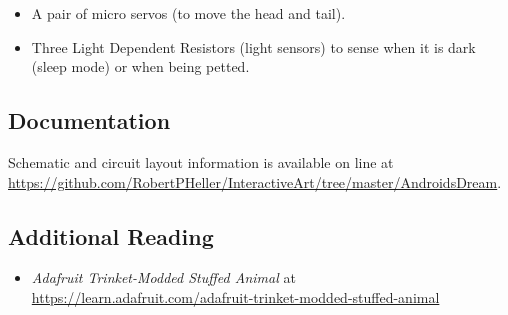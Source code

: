 \begin{itemize}
\item A pair of micro servos (to move the head and tail).
\item Three Light Dependent Resistors (light sensors) to sense when it is dark
(sleep mode) or when being petted.
\end{itemize}

\subsection*{Documentation}

Schematic and circuit layout information is available on line at 
\url{https://github.com/RobertPHeller/InteractiveArt/tree/master/AndroidsDream}.

\subsection*{Additional Reading}

\begin{itemize}
\item \textit{Adafruit Trinket-Modded Stuffed Animal} at 
\url{https://learn.adafruit.com/adafruit-trinket-modded-stuffed-animal} 
\end{itemize}

